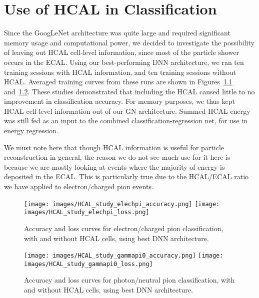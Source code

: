 \chapter{Use of HCAL in Classification}\label{app:classification_HCAL}

Since the GoogLeNet architecture was quite large and required significant memory usage and computational power, we decided to investigate the possibility of leaving out HCAL cell-level information, since most of the particle shower occurs in the ECAL. Using our best-performing DNN architecture, we ran ten training sessions with HCAL information, and ten training sessions without HCAL. Averaged training curves from these runs are shown in Figures~\ref{fig:HCAL_study_elechpi} and~\ref{fig:HCAL_study_gammapi0}. These studies demonstrated that including the HCAL caused little to no improvement in classification accuracy. For memory purposes, we thus kept HCAL cell-level information out of our GN architecture. Summed HCAL energy was still fed as an input to the combined classification-regression net, for use in energy regression.

We must note here that though HCAL information is useful for particle reconstruction in general, the reason we do not see much use for it here is because we are mostly looking at events where the majority of energy is deposited in the ECAL. This is particularly true due to the HCAL/ECAL ratio we have applied to electron/charged pion events.

\begin{figure}[htbp]
\centering
\texttt{[image: images/HCAL\_study\_elechpi\_accuracy.png]}
\texttt{[image: images/HCAL\_study\_elechpi\_loss.png]}
\caption{Accuracy and loss curves for electron/charged pion classification, with and without HCAL cells, using best DNN architecture.}
\label{fig:HCAL_study_elechpi}
\end{figure}

\begin{figure}[htbp]
\centering
\texttt{[image: images/HCAL\_study\_gammapi0\_accuracy.png]}
\texttt{[image: images/HCAL\_study\_gammapi0\_loss.png]}
\caption{Accuracy and loss curves for photon/neutral pion classification, with and without HCAL cells, using best DNN architecture.}
\label{fig:HCAL_study_gammapi0}
\end{figure}